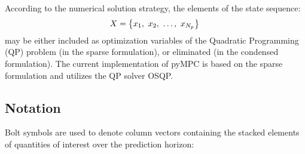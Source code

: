 \documentclass[a4paper,12pt,fleqn]{article}
\newcommand{\varx}{{X}}
\newcommand{\Np}{{N_p}}
\begin{document}
According to the numerical solution strategy, the elements of the state sequence:
\begin{equation}
  \varx  = \left\{ x_1,\ x_2,\ \dots, \ x_{\Np} \right \}\\ 
\end{equation}
may be either included as optimization variables of the Quadratic Programming (QP) problem (in the sparse formulation), or eliminated (in the condensed formulation). The current implementation of pyMPC is based on the sparse formulation and utilizes the QP solver OSQP. 

\subsection{Notation}
Bolt symbols are used to denote column vectors containing the stacked elements of quantities of interest over the prediction horizon:
\end{document}
